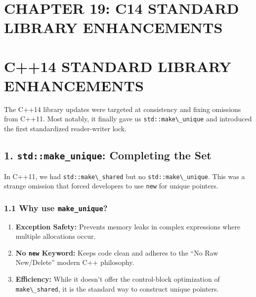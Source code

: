 \hypertarget{chapter-19-c14-standard-library-enhancements}{%
\section{CHAPTER 19: C14 STANDARD LIBRARY
ENHANCEMENTS}\label{chapter-19-c14-standard-library-enhancements}}

\hypertarget{c14-standard-library-enhancements}{%
\section{C++14 STANDARD LIBRARY
ENHANCEMENTS}\label{c14-standard-library-enhancements}}

The C++14 library updates were targeted at consistency and fixing
omissions from C++11. Most notably, it finally gave us
\passthrough{\lstinline!std::make\_unique!} and introduced the first
standardized reader-writer lock.

\hypertarget{stdmake_unique-completing-the-set}{%
\subsection{\texorpdfstring{1. \texttt{std::make\_unique}: Completing
the
Set}{1. std::make\_unique: Completing the Set}}\label{stdmake_unique-completing-the-set}}

In C++11, we had \passthrough{\lstinline!std::make\_shared!} but no
\passthrough{\lstinline!std::make\_unique!}. This was a strange omission
that forced developers to use \passthrough{\lstinline!new!} for unique
pointers.

\hypertarget{why-use-make_unique}{%
\subsubsection{\texorpdfstring{1.1 Why use
\texttt{make\_unique}?}{1.1 Why use make\_unique?}}\label{why-use-make_unique}}

\begin{enumerate}
\def\labelenumi{\arabic{enumi}.}
\tightlist
\item
  \textbf{Exception Safety:} Prevents memory leaks in complex
  expressions where multiple allocations occur.
\item
  \textbf{No \passthrough{\lstinline!new!} Keyword:} Keeps code clean
  and adheres to the ``No Raw New/Delete'' modern C++ philosophy.
\item
  \textbf{Efficiency:} While it doesn't offer the control-block
  optimization of \passthrough{\lstinline!make\_shared!}, it is the
  standard way to construct unique pointers.
\end{enumerate}

